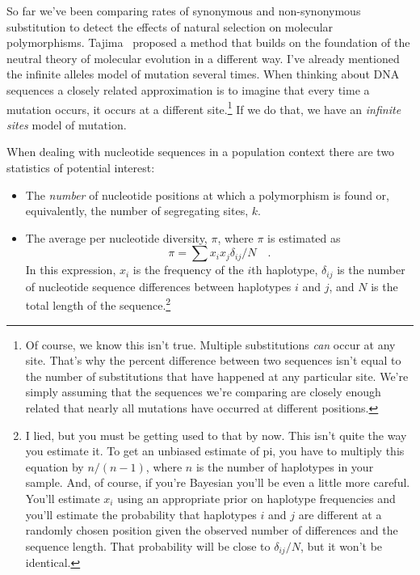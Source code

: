 So far we've been comparing rates of synonymous and non-synonymous
substitution to detect the effects of natural selection on molecular
polymorphisms. Tajima~\cite{Tajima89} proposed a method that builds on
the foundation of the neutral theory of molecular evolution in a
different way. I've already mentioned the infinite alleles model of
mutation several times. When thinking about DNA sequences a closely
related approximation is to imagine that every time a mutation occurs,
it occurs at a different site.\footnote{Of course, we know this isn't
  true. Multiple substitutions {\it can\/} occur at any site. That's
  why the percent difference between two sequences isn't equal to the
  number of substitutions that have happened at any particular
  site. We're simply assuming that the sequences we're comparing are
  closely enough related that nearly all mutations have occurred at
  different positions.} If we do that, we have an {\it infinite
  sites\/} model of mutation.

When dealing with nucleotide sequences in a population context there
are two statistics of potential interest:

\begin{itemize}

\item The {\it number\/} of nucleotide positions at which a
  polymorphism is found or, equivalently, the number of segregating
  sites, $k$.

\item The average per nucleotide diversity, $\pi$, where $\pi$ is
  estimated as
\[
\pi = \sum x_ix_j\delta_{ij}/N \quad .
\]
In this expression, $x_i$ is the frequency of the $i$th haplotype,
$\delta_{ij}$ is the number of nucleotide sequence differences between
haplotypes $i$ and $j$, and $N$ is the total length of the
sequence.\footnote{I lied, but you must be getting used to that by
  now. This isn't quite the way you estimate it. To get an unbiased
  estimate of pi, you have to multiply this equation by $n/(n-1)$,
  where $n$ is the number of haplotypes in your sample. And, of
  course, if you're Bayesian you'll be even a little more
  careful. You'll estimate $x_i$ using an appropriate prior on
  haplotype frequencies and you'll estimate the probability that
  haplotypes $i$ and $j$ are different at a randomly chosen position
  given the observed number of differences and the sequence
  length. That probability will be close to $\delta_{ij}/N$, but it
  won't be identical.}

\end{itemize}

